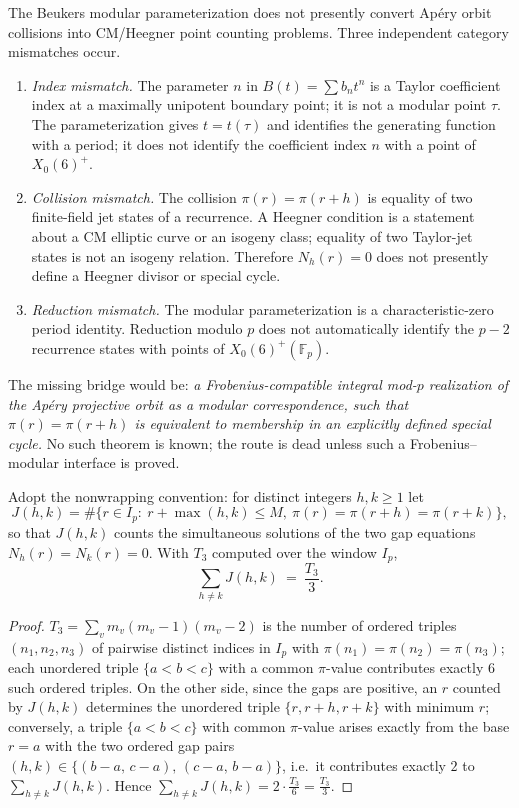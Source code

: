 \begin{remark}
\label{rem:sh-heegner}
The Beukers modular parameterization does not presently convert Ap\'ery
orbit collisions into CM/Heegner point counting problems.  Three
independent category mismatches occur.
\begin{enumerate}
\item[(i)] \emph{Index mismatch.}  The parameter $n$ in
$B(t)=\sum b_nt^n$ is a Taylor coefficient index at a maximally
unipotent boundary point; it is not a modular point $\tau$.  The
parameterization gives $t=t(\tau)$ and identifies the generating
function with a period; it does not identify the coefficient index $n$
with a point of $X_0(6)^+$.
\item[(ii)] \emph{Collision mismatch.}  The collision
$\pi(r)=\pi(r+h)$ is equality of two finite-field jet states of a
recurrence.  A Heegner condition is a statement about a CM elliptic
curve or an isogeny class; equality of two Taylor-jet states is not an
isogeny relation.  Therefore $N_h(r)=0$ does not presently define a
Heegner divisor or special cycle.
\item[(iii)] \emph{Reduction mismatch.}  The modular parameterization
is a characteristic-zero period identity.  Reduction modulo $p$ does not
automatically identify the $p-2$ recurrence states with points of
$X_0(6)^+(\mathbb F_p)$.
\end{enumerate}
The missing bridge would be: \emph{a Frobenius-compatible integral
mod-$p$ realization of the Ap\'ery projective orbit as a modular
correspondence, such that $\pi(r)=\pi(r+h)$ is equivalent to membership
in an explicitly defined special cycle.}  No such theorem is known; the
route is dead unless such a Frobenius--modular interface is proved.
\end{remark}

\begin{lemma}\label{lem:sh-triple-gap}
Adopt the nonwrapping convention: for distinct integers $h,k\ge1$ let
\[
 J(h,k)=\#\{r\in I_p:\ r+\max(h,k)\le M,\ \pi(r)=\pi(r+h)=\pi(r+k)\},
\]
so that $J(h,k)$ counts the simultaneous solutions of the two gap
equations $N_h(r)=N_k(r)=0$.  With $T_3$ computed over the window
$I_p$,
\[
 \sum_{h\ne k}J(h,k)\ =\ \frac{T_3}{3}.
\]
\end{lemma}

\begin{proof}
$T_3=\sum_vm_v(m_v-1)(m_v-2)$ is the number of ordered triples
$(n_1,n_2,n_3)$ of pairwise distinct indices in $I_p$ with
$\pi(n_1)=\pi(n_2)=\pi(n_3)$; each unordered triple $\{a<b<c\}$ with a
common $\pi$-value contributes exactly $6$ such ordered triples.  On the
other side, since the gaps are positive, an $r$ counted by $J(h,k)$
determines the unordered triple $\{r,r+h,r+k\}$ with minimum $r$;
conversely, a triple $\{a<b<c\}$ with common $\pi$-value arises exactly
from the base $r=a$ with the two ordered gap pairs
$(h,k)\in\{(b-a,\,c-a),\,(c-a,\,b-a)\}$, i.e.\ it contributes exactly
$2$ to $\sum_{h\ne k}J(h,k)$.  Hence
$\sum_{h\ne k}J(h,k)=2\cdot\tfrac{T_3}6=\tfrac{T_3}3$.
\end{proof}

